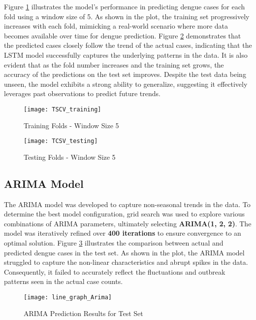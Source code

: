 Figure \ref{fig:tcsv_training} illustrates the model’s performance in predicting dengue cases for each fold using a window size of 5. As shown in the plot, the training set progressively increases with each fold, mimicking a real-world scenario where more data becomes available over time for dengue prediction. Figure \ref{fig:tcsv_testing} demonstrates that the predicted cases closely follow the trend of the actual cases, indicating that the LSTM model successfully captures the underlying patterns in the data. It is also evident that as the fold number increases and the training set grows, the accuracy of the predictions on the test set improves. Despite the test data being unseen, the model exhibits a strong ability to generalize, suggesting it effectively leverages past observations to predict future trends.

\begin{figure}[H]
	\centering
	\texttt{[image: TSCV\_training]}
	\caption{Training Folds - Window Size 5}
	\label{fig:tcsv_training}
\end{figure}

\begin{figure}[H]
	\centering
	\texttt{[image: TCSV\_testing]}
	\caption{Testing Folds - Window Size 5}
	\label{fig:tcsv_testing}
\end{figure}

\subsection{ARIMA Model}

The ARIMA model was developed to capture non-seasonal trends in the data. To determine the best model configuration, grid search was used to explore various combinations of ARIMA parameters, ultimately selecting \textbf{ARIMA(1, 2, 2)}. The model was iteratively refined over \textbf{400 iterations} to ensure convergence to an optimal solution. Figure \ref{fig:Arima_result} illustrates the comparison between actual and predicted dengue cases in the test set. As shown in the plot, the ARIMA model struggled to capture the non-linear characteristics and abrupt spikes in the data. Consequently, it failed to accurately reflect the fluctuations and outbreak patterns seen in the actual case counts.

\begin{figure}[H]
	\centering
	\texttt{[image: line\_graph\_Arima]}
	\caption{ARIMA Prediction Results for Test Set}
	\label{fig:Arima_result}
\end{figure}

